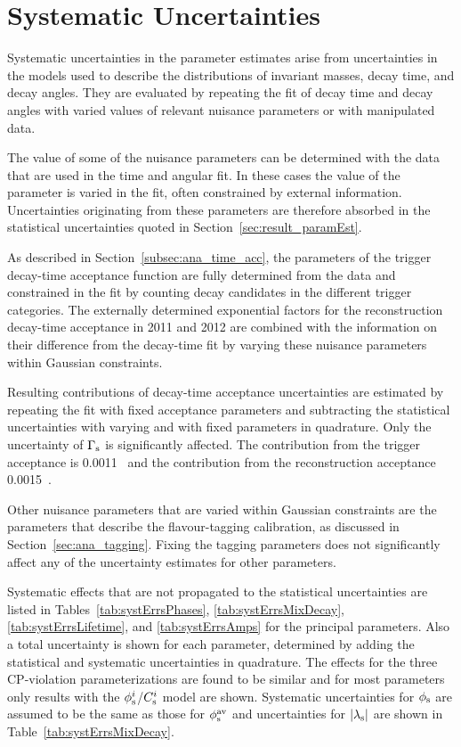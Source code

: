 \section{Systematic Uncertainties}
\label{sec:result_syst}

Systematic uncertainties in the parameter estimates arise from uncertainties in the models used to describe the distributions of invariant
masses, decay time, and decay angles. They are evaluated by repeating the fit of decay time and decay angles with varied values of relevant
nuisance parameters or with manipulated data.

The value of some of the nuisance parameters can be determined with the \BstoJpsiKK{} data that are used in the time and angular fit. In
these cases the value of the parameter is varied in the fit, often constrained by external information. Uncertainties originating from
these parameters are therefore absorbed in the statistical uncertainties quoted in Section~\ref{sec:result_paramEst}.

As described in Section~\ref{subsec:ana_time_acc}, the parameters of the trigger decay-time acceptance function are fully determined from
the \BstoJpsiKK{} data and constrained in the fit by counting decay candidates in the different trigger categories. The externally
determined exponential factors for the reconstruction decay-time acceptance in 2011 and 2012 are combined with the information on their
difference from the decay-time fit by varying these nuisance parameters within Gaussian constraints.

Resulting contributions of decay-time acceptance uncertainties are estimated by repeating the fit with fixed acceptance parameters and
subtracting the statistical uncertainties with varying and with fixed parameters in quadrature. Only the uncertainty of $\Gamma_\text{s}$ is
significantly affected. The contribution from the trigger acceptance is 0.0011~\invps{} and the contribution from the reconstruction
acceptance 0.0015~\invps.

Other nuisance parameters that are varied within Gaussian constraints are the parameters that describe the flavour-tagging calibration, as
discussed in Section~\ref{sec:ana_tagging}. Fixing the tagging parameters does not significantly affect any of the uncertainty estimates
for other parameters.

Systematic effects that are not propagated to the statistical uncertainties are listed in Tables~\ref{tab:systErrsPhases},
\ref{tab:systErrsMixDecay}, \ref{tab:systErrsLifetime}, and \ref{tab:systErrsAmps} for the principal parameters. Also a total uncertainty
is shown for each parameter, determined by adding the statistical and systematic uncertainties in quadrature. The effects for the three
CP-violation parameterizations are found to be similar and for most parameters only results with the $\phi_\text{s}^{i}$/$C_\text{s}^{i}$ model are shown.
Systematic uncertainties for $\phi_\text{s}$ are assumed to be the same as those for $\phi_\text{s}^{\text{av}}$ and uncertainties for $|{\lambda_{\text{s}}}|$ are shown in
Table~\ref{tab:systErrsMixDecay}.

